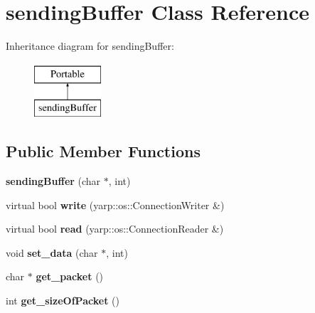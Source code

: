 \hypertarget{classsendingBuffer}{\section{sending\-Buffer Class Reference}
\label{classsendingBuffer}
}
Inheritance diagram for sending\-Buffer\-:\begin{figure}[H]
\begin{center}
\leavevmode
\includegraphics[height=2.000000cm]{classsendingBuffer}
\end{center}
\end{figure}
\subsection*{Public Member Functions}
\begin{DoxyCompactItemize}
\item 
\hypertarget{classsendingBuffer_ab4c1d25d2e85e15f48e06873097deaa2}{{\bfseries sending\-Buffer} (char $\ast$, int)}\label{classsendingBuffer_ab4c1d25d2e85e15f48e06873097deaa2}

\item 
\hypertarget{classsendingBuffer_a40b2e61a078ebe6ea507afd73728f82c}{virtual bool {\bfseries write} (yarp\-::os\-::\-Connection\-Writer \&)}\label{classsendingBuffer_a40b2e61a078ebe6ea507afd73728f82c}

\item 
\hypertarget{classsendingBuffer_ad148ea47f1ef7d56e522909c212ae552}{virtual bool {\bfseries read} (yarp\-::os\-::\-Connection\-Reader \&)}\label{classsendingBuffer_ad148ea47f1ef7d56e522909c212ae552}

\item 
\hypertarget{classsendingBuffer_adf6ced8e177d52765bc8504af4aa0a45}{void {\bfseries set\-\_\-data} (char $\ast$, int)}\label{classsendingBuffer_adf6ced8e177d52765bc8504af4aa0a45}

\item 
\hypertarget{classsendingBuffer_a81ead3fede32e415e1073f31d9bc2f43}{char $\ast$ {\bfseries get\-\_\-packet} ()}\label{classsendingBuffer_a81ead3fede32e415e1073f31d9bc2f43}

\item 
\hypertarget{classsendingBuffer_a76aaef5c8f64d644c04536a9dbb75de6}{int {\bfseries get\-\_\-size\-Of\-Packet} ()}\label{classsendingBuffer_a76aaef5c8f64d644c04536a9dbb75de6}

\end{DoxyCompactItemize}


